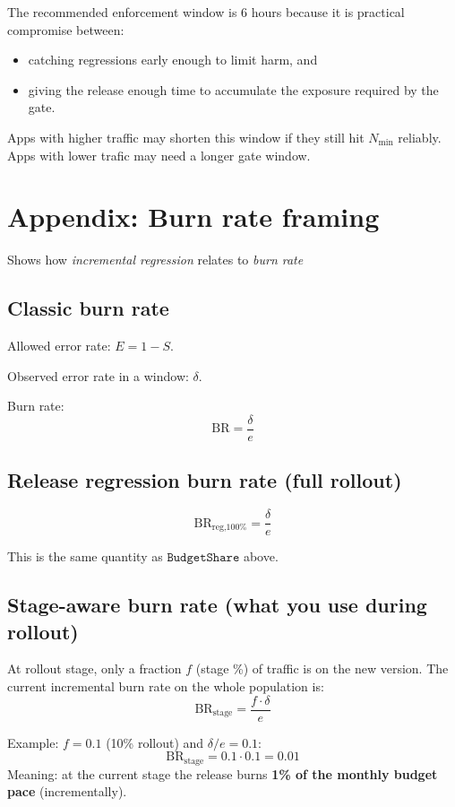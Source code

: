 \documentclass{article}
\begin{document}
The recommended enforcement window is 6 hours because it is practical compromise between:
\begin{itemize}[leftmargin=1.8em]
    \item catching regressions early enough to limit harm, and
    \item giving the release enough time to accumulate the exposure required by the gate.
\end{itemize}

Apps with higher traffic may shorten this window if they still hit $N_{\min}$ reliably.
Apps with lower trafic may need a longer gate window.


\pagebreak

\section*{Appendix: Burn rate framing}

Shows how \emph{incremental regression} relates to \emph{burn rate}

\subsection*{Classic burn rate}
Allowed error rate: $E = 1 - S$.

Observed error rate in a window: $\delta$.

Burn rate:
\[
\mathrm{BR} = \frac{\delta}{e}
\]

\subsection*{Release regression burn rate (full rollout)}

\[
\mathrm{BR}_{\text{reg,100\%}} = \frac{\delta}{e}
\]

This is the same quantity as $\texttt{BudgetShare}$ above.

\subsection*{Stage-aware burn rate (what you use during rollout)}
At rollout stage, only a fraction $f$ (stage \%) of traffic is on the new version. The current incremental burn rate on the whole population is:
\[
\mathrm{BR}_{\text{stage}} = \frac{f \cdot \delta}{e}
\]

Example: $f=0.1$ (10\% rollout) and $\delta/e=0.1$:
\[
\mathrm{BR}_{\text{stage}} = 0.1 \cdot 0.1 = 0.01
\]
Meaning: at the current stage the release burns \textbf{1\% of the monthly budget pace} (incrementally).
\end{document}
